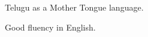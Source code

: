 \begin{cventries}
    \cventry
    {}
    {}
    {}
    {}
    {
    \begin{cvitems}
        \item {Telugu as a Mother Tongue language.}
        \item {Good fluency in English.}
    \end{cvitems}
    }
\end{cventries}